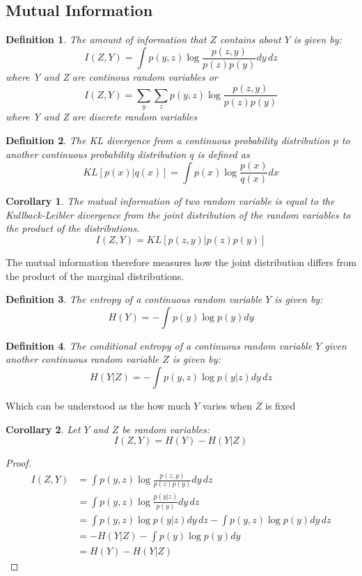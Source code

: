 \documentclass[11pt,oneside,openright]{report}
\newtheorem{definition}{Definition}
\newtheorem{corollary}{Corollary}
\begin{document}
\subsection{Mutual Information}

\begin{definition}
The amount of information that $Z$ contains about $Y$ is given by:
$$ I(Z, Y) = \int p(y, z) \log \frac{p(z, y)}{p(z)p(y)} dy\,dz $$ where Y and Z are continous random variables or 
 $$ I(Z, Y) = \sum_y \sum_z p(y, z) \log \frac{p(z, y)}{p(z)p(y)} $$ where Y and Z are discrete random variables 
\end{definition}

\begin{definition}
The KL divergence from a continuous probability distribution $p$ to another continuous probability distribution $q$ is defined as 
$$ KL[p(x)|q(x)] = \int p(x) \log \frac{p(x)}{q(x)} dx $$
\end{definition}

\begin{corollary}
The mutual information of two random variable is equal to the Kullback-Leibler divergence from the joint distribution of the random variables to the product of the distributions.
$$ I(Z, Y) = KL[p(z, y) | p(z)p(y)] $$
\end{corollary}
The mutual information therefore measures how the joint distribution differs from the product of the marginal distributions. 

\begin{definition}
The entropy of a continuous random variable $Y$ is given by:
$$ H(Y)  = -\int p(y) \log p(y) dy $$
\end{definition}

\begin{definition}
The conditional entropy of a continuous random variable $Y$ given another continuous random variable $Z$ is given by:
$$ H(Y|Z)  = -\int p(y, z) \log p(y|z) dy\,dz $$
\end{definition}
Which can be understood as the how much $Y$ varies when $Z$ is fixed

\begin{corollary}
Let $Y$ and $Z$ be random variables:
\begin{equation}
I(Z, Y) = H(Y) - H(Y|Z)
\label{eq:mutual_info_cond_entropy}
\end{equation}
\end{corollary}

\begin{proof}
\begin{align}
I(Z, Y) &= \int p(y, z) \log \frac{p(z, y)}{p(z)p(y)} dy\,dz\\
& = \int p(y, z) \log \frac{p(y|z)}{p(y)} dy\,dz \label{eq:mi_zy}\\
&= \int p(y, z) \log p(y|z) dy\,dz - \int p(y, z) \log p(y) dy\,dz\\ 
&= - H(Y|Z) - \int p(y) \log p(y) dy\\ 
&= H(Y) - H(Y|Z)
\end{align}
\end{proof}
\end{document}

